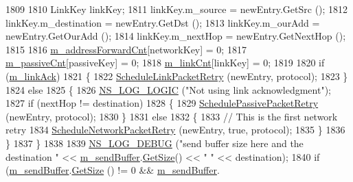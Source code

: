 \begin{DoxyCode}
1809 
1810               LinkKey linkKey;
1811               linkKey.m\_source = newEntry.GetSrc ();
1812               linkKey.m\_destination = newEntry.GetDst ();
1813               linkKey.m\_ourAdd = newEntry.GetOurAdd ();
1814               linkKey.m\_nextHop = newEntry.GetNextHop ();
1815 
1816               \hyperlink{classns3_1_1dsr_1_1DsrRouting_a5042f7e5df0470025fdb6023fcc24411}{m\_addressForwardCnt}[networkKey] = 0;
1817               \hyperlink{classns3_1_1dsr_1_1DsrRouting_a7fec404d680459aab2b40941a950502d}{m\_passiveCnt}[passiveKey] = 0;
1818               \hyperlink{classns3_1_1dsr_1_1DsrRouting_a85ba159639f9bc13b3d8890458128a79}{m\_linkCnt}[linkKey] = 0;
1819 
1820               \textcolor{keywordflow}{if} (\hyperlink{classns3_1_1dsr_1_1DsrRouting_a216a52d8b579a034df948765d941d3a4}{m\_linkAck})
1821                 \{
1822                   \hyperlink{classns3_1_1dsr_1_1DsrRouting_a947d831bc0964240b1a41b3a09832eff}{ScheduleLinkPacketRetry} (newEntry, protocol);
1823                 \}
1824               \textcolor{keywordflow}{else}
1825                 \{
1826                   \hyperlink{group__logging_ga88acd260151caf2db9c0fc84997f45ce}{NS\_LOG\_LOGIC} (\textcolor{stringliteral}{"Not using link acknowledgment"});
1827                   \textcolor{keywordflow}{if} (nextHop != destination)
1828                     \{
1829                       \hyperlink{classns3_1_1dsr_1_1DsrRouting_abfdfa37822a492971fdf24540b635039}{SchedulePassivePacketRetry} (newEntry, protocol);
1830                     \}
1831                   \textcolor{keywordflow}{else}
1832                     \{
1833                       \textcolor{comment}{// This is the first network retry}
1834                       \hyperlink{classns3_1_1dsr_1_1DsrRouting_a6a18c6baa374d5e6a68f8952d1afdb13}{ScheduleNetworkPacketRetry} (newEntry, \textcolor{keyword}{true}, protocol);
1835                     \}
1836                 \}
1837             \}
1838 
1839           \hyperlink{group__logging_ga413f1886406d49f59a6a0a89b77b4d0a}{NS\_LOG\_DEBUG} (\textcolor{stringliteral}{"send buffer size here and the destination "} << 
      \hyperlink{classns3_1_1dsr_1_1DsrRouting_a887ae39d7060171753c0605d5c120549}{m\_sendBuffer}.\hyperlink{classns3_1_1dsr_1_1DsrSendBuffer_a0ecf75786eef7193fa5a5d84b2b7a1f0}{GetSize}() << \textcolor{stringliteral}{" "} << destination);
1840           \textcolor{keywordflow}{if} (\hyperlink{classns3_1_1dsr_1_1DsrRouting_a887ae39d7060171753c0605d5c120549}{m\_sendBuffer}.\hyperlink{classns3_1_1dsr_1_1DsrSendBuffer_a0ecf75786eef7193fa5a5d84b2b7a1f0}{GetSize} () != 0 && \hyperlink{classns3_1_1dsr_1_1DsrRouting_a887ae39d7060171753c0605d5c120549}{m\_sendBuffer}.

\end{DoxyCode}
